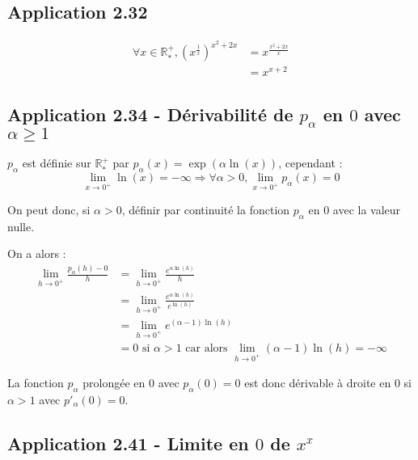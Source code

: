 \documentclass[a4paper,10pt]{report}
\begin{document}
\subsection*{Application 2.32}
\begin{equation*}
	\begin{split}
		\forall x \in \mathbb{R}^{+}_{*}, \left(  x^{\frac{1}{x}} \right)^{x^2+2x}
		&= x^{\frac{x^2+2x}{x}} \\
		&= x^{x+2}
	\end{split}
\end{equation*}


\subsection*{Application 2.34 - Dérivabilité de $p_{\alpha}$ en $0$ avec $\alpha \geq 1$}

$p_{\alpha}$ est définie sur $\mathbb{R}^{+}_{*}$ par $p_{\alpha}(x) = \exp(\alpha \ln(x))$, cependant :
\begin{displaymath}
	\lim_{x\rightarrow 0^{+}} \ln(x) = -\infty \Longrightarrow\forall \alpha>0, \lim_{x\rightarrow 0^{+}} p_{\alpha}(x) = 0
\end{displaymath}

On peut donc, si $\alpha > 0$, définir par continuité la fonction $p_{\alpha}$ en $0$ avec la valeur nulle.

On a alors :
\begin{equation*}
	\begin{split}
		\lim_{h\rightarrow 0^{+}} \frac{p_{\alpha}(h) - 0}{h}
		&= \lim_{h\rightarrow 0^{+}} \frac{e^{\alpha \ln(h)}}{h} \\
		&= \lim_{h\rightarrow 0^{+}} \frac{e^{\alpha \ln(h)}}{e^{\ln(h)}} \\
		&= \lim_{h\rightarrow 0^{+}} e^{(\alpha-1) \ln(h)} \\
		&=0 \text{ si $\alpha >1$ car alors $\lim_{h\rightarrow 0^{+}} (\alpha-1) \ln(h) = -\infty$}
	\end{split}
\end{equation*}

La fonction $p_{\alpha}$ prolongée en $0$ avec $p_{\alpha}(0)=0$ est donc dérivable à droite en $0$ si $\alpha>1$
avec $p'_{\alpha}(0)=0$.


\subsection*{Application 2.41 - Limite en $0$ de $x^x$}
\end{document}
